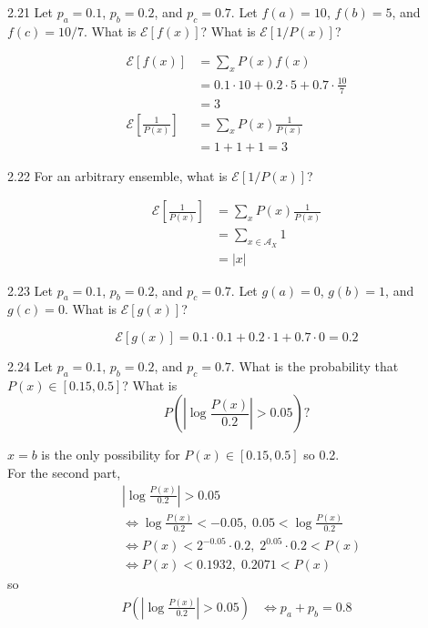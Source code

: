 \documentclass[12pt, a4paper]{article}
\begin{document}
\begin{prob}{2.21}
    Let $p_a=0.1$, $p_b=0.2$, and $p_c=0.7$. Let $f(a)=10$, $f(b)=5$, and $f(c)=10/7$. What is $\mathcal{E}[f(x)]$? What is $\mathcal{E}[1/P(x)]$?
\end{prob}
\begin{sol}
    \begin{align*}
        \mathcal{E}\left[f(x)\right] &=  \sum_{x}P(x)f(x) \\
        &= 0.1 \cdot 10 + 0.2 \cdot 5 + 0.7 \cdot \frac{10}{7} \\
        &= 3 \\[10pt]
        \mathcal{E}\left[\frac{1}{P(x)}\right] &=  \sum_{x}P(x)\frac{1}{P(x)} \\
        &= 1 + 1 + 1 = 3
    \end{align*}
\end{sol}
\bigskip

\begin{prob}{2.22}
    For an arbitrary ensemble, what is $\mathcal{E}[1/P(x)]$?
\end{prob}
\begin{sol}
    \begin{align*}
        \mathcal{E}\left[\frac{1}{P(x)}\right] &=  \sum_{x}P(x)\frac{1}{P(x)} \\
        &= \sum_{x \in \mathcal{A}_X} 1 \\
        &= |x|
    \end{align*}
\end{sol}
\bigskip


\begin{prob}{2.23}
    Let $p_a=0.1$, $p_b=0.2$, and $p_c=0.7$. Let $g(a)=0$, $g(b)=1$, and $g(c)=0$. What is $\mathcal{E}[g(x)]$?
\end{prob}
\begin{sol}
    $$\mathcal{E}[g(x)] = 0.1 \cdot 0.1 + 0.2 \cdot 1 + 0.7 \cdot 0 = 0.2$$
\end{sol}
\bigskip

\begin{prob}{2.24}
    Let $p_a=0.1$, $p_b=0.2$, and $p_c=0.7$. What is the probability that $P(x) \in [0.15, 0.5]$? What is
\[
P \left( \left| \log \frac{P(x)}{0.2} \right| > 0.05 \right)?
\]
\end{prob}
\begin{sol}
    $x = b$ is the only possibility for $P(x) \in [0.15, 0.5]$ so 0.2. \\
    For the second part,
    \begin{align*}
        &\left| \log \frac{P(x)}{0.2} \right| > 0.05 \\
        &\iff \log \frac{P(x)}{0.2} < -0.05, \; 0.05 < \log \frac{P(x)}{0.2} \\
        &\iff P(x) < 2^{-0.05} \cdot 0.2, \; 2^{0.05} \cdot 0.2 < P(x) \\
        &\iff P(x) <  0.1932, \; 0.2071 < P(x) 
    \end{align*}
    so
    \begin{align*}
        P \left( \left| \log \frac{P(x)}{0.2} \right| > 0.05 \right) 
        &\iff p_a + p_b = 0.8
    \end{align*}
\end{sol}
\bigskip
\end{document}

